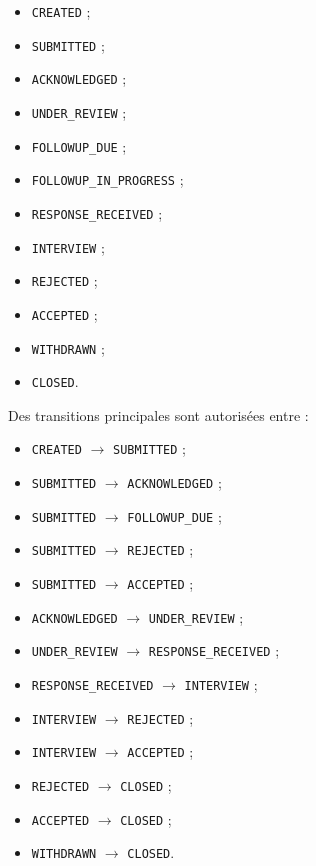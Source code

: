 \documentclass[11pt,a4paper]{article}
\begin{document}
\begin{itemize}
    \item \texttt{CREATED} ;
    \item \texttt{SUBMITTED} ;
    \item \texttt{ACKNOWLEDGED} ;
    \item \texttt{UNDER\_REVIEW} ;
    \item \texttt{FOLLOWUP\_DUE} ;
    \item \texttt{FOLLOWUP\_IN\_PROGRESS} ;
    \item \texttt{RESPONSE\_RECEIVED} ;
    \item \texttt{INTERVIEW} ;
    \item \texttt{REJECTED} ;
    \item \texttt{ACCEPTED} ;
    \item \texttt{WITHDRAWN} ;
    \item \texttt{CLOSED}.
\end{itemize}

Des transitions principales sont autorisées entre :

\begin{itemize}
    \item \texttt{CREATED} $\rightarrow$ \texttt{SUBMITTED} ;
    \item \texttt{SUBMITTED} $\rightarrow$ \texttt{ACKNOWLEDGED} ;
    \item \texttt{SUBMITTED} $\rightarrow$ \texttt{FOLLOWUP\_DUE} ;
    \item \texttt{SUBMITTED} $\rightarrow$ \texttt{REJECTED} ;
    \item \texttt{SUBMITTED} $\rightarrow$ \texttt{ACCEPTED} ;
    \item \texttt{ACKNOWLEDGED} $\rightarrow$ \texttt{UNDER\_REVIEW} ;
    \item \texttt{UNDER\_REVIEW} $\rightarrow$ \texttt{RESPONSE\_RECEIVED} ;
    \item \texttt{RESPONSE\_RECEIVED} $\rightarrow$ \texttt{INTERVIEW} ;
    \item \texttt{INTERVIEW} $\rightarrow$ \texttt{REJECTED} ;
    \item \texttt{INTERVIEW} $\rightarrow$ \texttt{ACCEPTED} ;
    \item \texttt{REJECTED} $\rightarrow$ \texttt{CLOSED} ;
    \item \texttt{ACCEPTED} $\rightarrow$ \texttt{CLOSED} ;
    \item \texttt{WITHDRAWN} $\rightarrow$ \texttt{CLOSED}.
\end{itemize}
\end{document}
